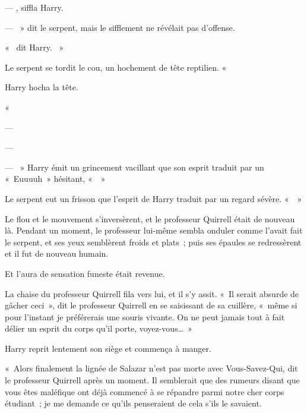 --- , siffla Harry.

--- ~» dit le serpent, mais le sifflement ne révélait pas d'offense.

«~ dit Harry.
~»

Le serpent se tordit le cou, un hochement de tête reptilien.
«~

Harry hocha la tête.

«~

--- 

--- 

--- ~» Harry émit un grincement vacillant que son esprit traduit par un «~Euuuuh~» hésitant, «~~»

Le serpent eut un frisson que l'esprit de Harry traduit par un regard sévère.
«~~»

Le flou et le mouvement s'inversèrent, et le professeur Quirrell était de nouveau là.
Pendant un moment, le professeur lui-même sembla onduler comme l'avait fait le serpent, et ses yeux semblèrent froids et plats~; puis ses épaules se redressèrent et il fut de nouveau humain.

Et l'aura de sensation funeste était revenue.

La chaise du professeur Quirrell fila vers lui, et il s'y assit.
«~Il serait absurde de gâcher ceci~», dit le professeur Quirrell en se saisissant de sa cuillère, «~même si pour l'instant je préférerais une souris vivante.
On ne peut jamais tout à fait délier un esprit du corps qu'il porte, voyez-vous…~»

Harry reprit lentement son siège et commença à manger.

\later

«~Alors finalement la lignée de Salazar n'est pas morte avec Vous-Savez-Qui, dit le professeur Quirrell après un moment.
Il semblerait que des rumeurs disant que vous êtes maléfique ont déjà commencé à se répandre parmi notre cher corps étudiant~; je me demande ce qu'ils penseraient de cela s'ils le savaient.

